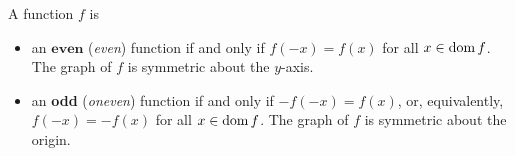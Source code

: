 \begin{definition}\label{evenoddfun}
A function $f$ is
\vspace{-0.3cm}
\begin{itemize}
\item an $\textbf{even}$ (\textit{even}) function if and only if $f(-x) = f(x)$ for all $x\in\text{dom}{\,}f$. The graph of $f$ is symmetric about the $y$-axis.
\item an \textbf{odd} (\textit{oneven}) function if and only if $-f(-x) = f(x)$, or, equivalently, $f(-x) = -f(x)$ for all $x\in\text{dom}{\,}f$. The graph of $f$ is symmetric about the origin.
\end{itemize}
\end{definition}

